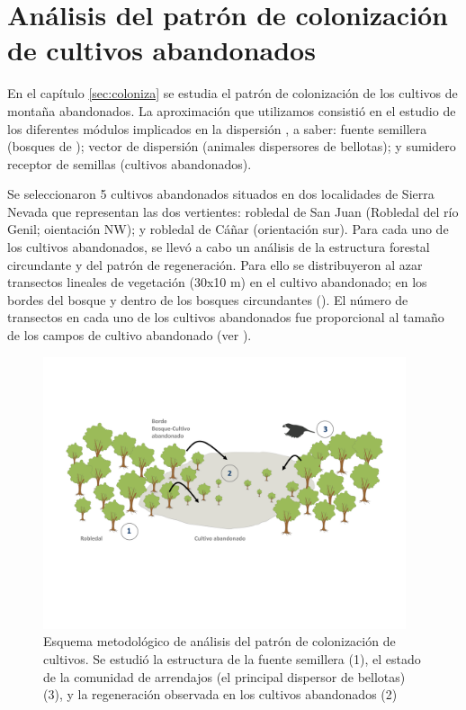 \section{Análisis del patrón de colonización de cultivos abandonados}\label{sec:metodologia:coloniza}

En el capítulo \ref{sec:coloniza} se estudia el patrón de colonización de los cultivos de montaña abandonados. La aproximación que utilizamos consistió en el estudio de los diferentes módulos implicados en la dispersión \autocite[][]{LundbergMoberg2003MobileLink,Nathanetal2012DispersalKernels}, a saber: fuente semillera (bosques de \Qpy); vector de dispersión (animales dispersores de bellotas); y  sumidero receptor de semillas (cultivos abandonados).

Se seleccionaron 5 cultivos abandonados situados en dos localidades de Sierra Nevada que representan las dos vertientes: robledal de San Juan (Robledal del río Genil; oientación NW); y robledal de Cáñar (orientación sur). Para cada uno de los cultivos abandonados, se llevó a cabo un análisis de la estructura forestal circundante y del patrón de regeneración. Para ello se  distribuyeron al azar transectos lineales de vegetación (30x10 m) en el cultivo abandonado; en los bordes del bosque y dentro de los bosques circundantes (). El número de transectos en cada uno de los cultivos abandonados fue proporcional al tamaño de los campos de cultivo abandonado (ver ). 

\begin{figure}[ht]
    \centering
    \includegraphics[width=0.95\textwidth]{img/metodologia/metodologia-coloniza.pdf}
    \caption{Esquema metodológico de análisis del patrón de colonización de cultivos. Se estudió la estructura de la fuente semillera (1), el estado de la comunidad de arrendajos (el principal dispersor de bellotas)(3), y la regeneración observada en los cultivos abandonados (2)}
    \label{fig:metodologia:coloniza}
\end{figure}


